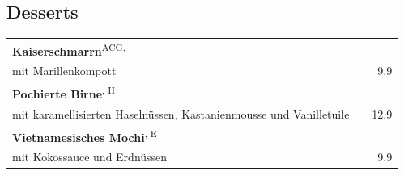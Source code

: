 \documentclass[a4paper,12pt]{article}
\newcommand{\vegan}{\textbf{\scriptsize \color{vegan}{Vegan}}}
\newcommand{\vegetarisch}{\textbf{\scriptsize \color{vegan}{Veg}}}
\begin{document}
\begin{multicols}{2}
\section*{Desserts}
\begin{tabular}{Lrr}
\textbf{Kaiserschmarrn}\textsuperscript{{\scriptsize ACG, \vegetarisch}}\\
\hspace{0.4cm}\scriptsize mit Marillenkompott & & 9.9\\
\textbf{Pochierte Birne}\textsuperscript{{\scriptsize \vegan, H}}\\
\hspace{0.4cm}\scriptsize mit karamellisierten Haselnüssen, Kastanienmousse und Vanilletuile & & 12.9\\
\textbf{Vietnamesisches Mochi}\textsuperscript{{\scriptsize \vegan, E}}\\
\hspace{0.4cm}\scriptsize mit Kokossauce und Erdnüssen & & 9.9 \\
\end{tabular}





\end{multicols}
\end{document}
